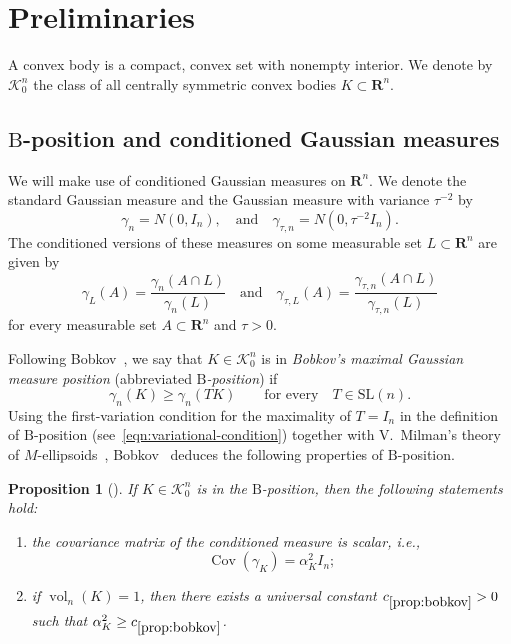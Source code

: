 \documentclass[11pt]{amsart}
\newcommand{\R}{\mathbf R}
\newcommand{\Vol}{\operatorname{vol}}
\newcommand{\Cov}{\operatorname{Cov}}
\newcommand{\SL}{\mathrm{SL}}
\newcommand{\1}{\mathbf 1}
\newcommand{\ie}{\emph{i.e.,}}
\newcommand{\Bodies}{\mathcal{K}_0^n}
\newcommand{\Bobkov}{\mathrm{B}}
\let\vol\Vol
\theoremstyle{plain}
\newtheorem{proposition}[theorem]{Proposition}
\begin{document}
\section{Preliminaries}

A convex body is a compact, convex set with nonempty interior. We denote by $\Bodies$ the class of all centrally symmetric convex bodies $K \subset \R^n$.


\subsection{\texorpdfstring{$\Bobkov$}{B}-position and conditioned Gaussian measures}

We will make use of conditioned Gaussian measures on $\R^n$. We denote the standard Gaussian measure and the Gaussian measure with variance $\tau^{-2}$ by
\[
\gamma_n = N(0, I_n), \quad \mbox{and} \quad 
\gamma_{\tau, n} = N(0, \tau^{-2} I_n).
\]
The conditioned versions of these measures on some measurable set $L \subset \R^n$ are given by 
\[
\gamma_{L}(A) = \frac{\gamma_n(A \cap L)}{\gamma_n(L)} 
\quad \mbox{and} \quad 
\gamma_{\tau, L}(A) = \frac{\gamma_{\tau,n}(A \cap L)}{\gamma_{\tau, n}(L)} 
\]
for every measurable set $A \subset \R^n$ and $\tau > 0$. 

\medskip 

Following Bobkov~\cite{Bob11}, we say that $K \in \Bodies$ is in \emph{Bobkov's maximal Gaussian measure position} (abbreviated \emph{$\Bobkov$-position}) if
\begin{equation}\label{eqn:variational-condition}
\gamma_n(K) \geq \gamma_n(TK) 
\qquad\text{for every} \quad 
T\in\SL(n).
\end{equation}
Using the first-variation condition for the maximality of $T = I_n$
in the definition of $\Bobkov$-position (see~\eqref{eqn:variational-condition}) together with V.\ Milman's theory of $M$-ellipsoids~\cite{Mil86}, Bobkov~\cite{Bob11} deduces the following properties of $\Bobkov$-position.

\begin{proposition}
[{\cite[Proposition 3.11, p.~32]{Bob11}}]
\label{prop:bobkov}
    If $K \in \Bodies$ is
	    in the $\Bobkov$-position, then the following statements hold:
    \begin{enumerate}[label=(\roman*)]
    \item 
    \label{item:scalar-covariance}
    the covariance matrix of the conditioned measure is scalar, \ie 
\[
\Cov(\gamma_K) = \alpha_{K}^2 I_n;
\]    
    \item
    \label{item:bound-on-alpha}
     if $\vol_n(K) = 1$, then there exists a universal constant $c_{\ref{prop:bobkov}} > 0$ such that 
     $\alpha_{K}^2 \geq c_{\ref{prop:bobkov}}$. 
    \end{enumerate}
\end{proposition}
\end{document}
